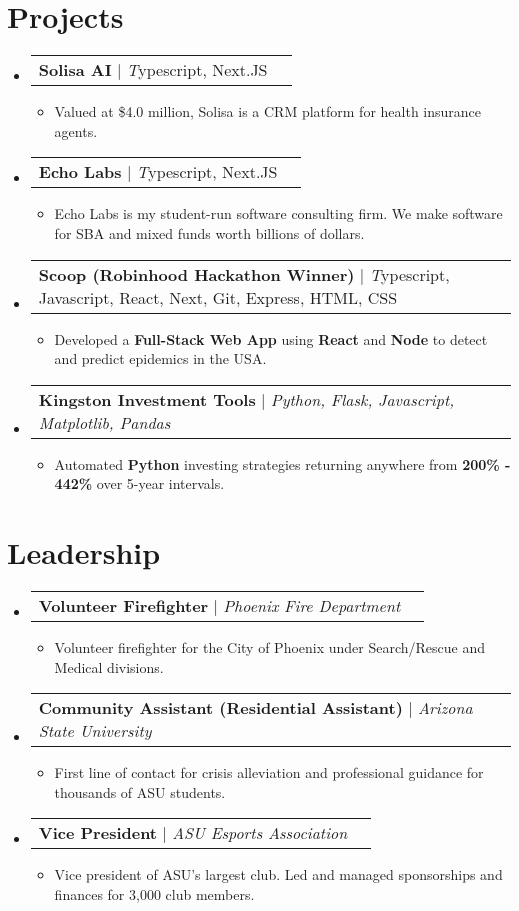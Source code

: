 \documentclass[letterpaper,10pt]{article}
\makeatletter
\newcommand{\resumeItem}[1]{
  \item\small{
    {#1 \vspace{-2pt}}
  }
}
\newcommand{\resumeProjectHeading}[2]{
    \item
    \begin{tabular*}{0.97\textwidth}{l@{\extracolsep{\fill}}r}
      \small#1 & #2 \\
    \end{tabular*}\vspace{-7pt}
}
\newcommand{\resumeSubHeadingListStart}{\begin{itemize}[leftmargin=0.15in, label={}]}
\newcommand{\resumeSubHeadingListEnd}{\end{itemize}}
\newcommand{\resumeItemListStart}{\begin{itemize}}
\newcommand{\resumeItemListEnd}{\end{itemize}\vspace{-5pt}}
\makeatother
\begin{document}
\section{Projects}


    \resumeSubHeadingListStart

    \resumeProjectHeading
          {\textbf{Solisa AI} $|$ \emph Typescript, Next.JS}{}
          \resumeItemListStart
            \resumeItem{Valued at \$4.0 million, Solisa is a CRM platform for health insurance agents.}
          \resumeItemListEnd
    \resumeProjectHeading
          {\textbf{Echo Labs} $|$ \emph Typescript, Next.JS}{}
          \resumeItemListStart
            \resumeItem{Echo Labs is my student-run software consulting firm. We make software for SBA and mixed funds worth billions of dollars.}
          \resumeItemListEnd
        \resumeProjectHeading
          {\textbf{Scoop (Robinhood Hackathon Winner)} $|$ \emph Typescript, Javascript, React, Next, Git, Express, HTML, CSS}{}
          \resumeItemListStart
            \resumeItem{Developed a \textbf{Full-Stack Web App} using \textbf{React} and \textbf{Node} to detect and predict epidemics in the USA.}
          \resumeItemListEnd
      \resumeProjectHeading
          {\textbf{Kingston Investment Tools} $|$ \emph{Python, Flask, Javascript, Matplotlib, Pandas}}{}
          \resumeItemListStart
            \resumeItem{Automated \textbf{Python} investing strategies returning anywhere from \textbf{200\% - 442\%} over 5-year intervals.}
          \resumeItemListEnd


        
    \resumeSubHeadingListEnd
\section{Leadership}
    \resumeSubHeadingListStart
      \resumeProjectHeading
          {\textbf{Volunteer Firefighter} $|$ \emph{Phoenix Fire Department}}{}
          \resumeItemListStart
            \resumeItem{Volunteer firefighter for the City of Phoenix under Search/Rescue and Medical divisions.}
          \resumeItemListEnd
          
      \resumeProjectHeading
          {\textbf{Community Assistant (Residential Assistant)} $|$ \emph{Arizona State University}}{}
          \resumeItemListStart
            \resumeItem{First line of contact for crisis alleviation and professional guidance for thousands of ASU students. }
          \resumeItemListEnd
          
      \resumeProjectHeading
          {\textbf{Vice President} $|$ \emph{ASU Esports Association}}{}
          \resumeItemListStart
            \resumeItem{Vice president of ASU's largest club. Led and managed sponsorships and finances for 3,000 club members.}
          \resumeItemListEnd
          
    \resumeSubHeadingListEnd


\end{document}
